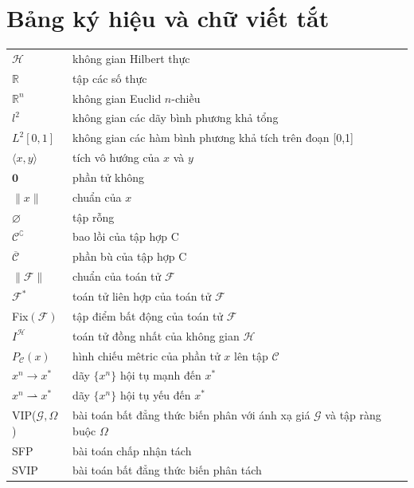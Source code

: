 \chapter*{Bảng ký hiệu và chữ viết tắt}

\begin{tabular}
    {@{\hspace{0.6cm}} l @{\hspace{1.8cm}}p{11.5cm}l}
    $\mathcal{H}$ & không gian Hilbert thực\\
    $\mathbb R$ & tập các số thực\\
    $\mathbb R^n$ & không gian Euclid $n$-chiều\\
    $l^2$ & không gian các dãy bình phương khả tổng\\
    $L^2[0,1]$ & không gian các hàm bình phương khả tích trên đoạn [0,1]\\
    $\langle x,y\rangle$ & tích vô hướng của $x$ và $y$\\
    $\mathbf{0}$ & phần tử không\\
    $\|x\|$ & chuẩn của $x$\\
    $\varnothing$ & tập rỗng\\
    $\mathcal{C}^\complement$ & bao lồi của tập hợp C\\
    $\overline{\mathcal{C}}$ & phần bù của tập hợp C\\
    $\|\mathcal{F}\|$ & chuẩn của toán tử $\mathcal{F}$\\
    $\mathcal{F}^*$ & toán tử liên hợp của toán tử $\mathcal{F}$\\
    Fix$(\mathcal{F})$ & tập điểm bất động của toán tử $\mathcal{F}$\\
    $I^{\mathcal{H}}$ & toán tử đồng nhất của không gian $\mathcal{H}$\\
    $P_\mathcal{C}(x)$ & hình chiếu mêtric của phần tử $x$ lên tập $\mathcal{C}$\\
    $x^n \to x^*$ & dãy $\{x^n\}$ hội tụ mạnh đến $x^*$\\
    $x^n \rightharpoonup x^*$ & dãy $\{x^n\}$ hội tụ yếu đến $x^*$\\
    VIP($\mathcal{G}, \Omega$) & bài toán bất đẳng thức biến phân với ánh xạ giá $\mathcal{G}$ và tập ràng buộc $\Omega$\\
    SFP & bài toán chấp nhận tách\\
    SVIP & bài toán bất đẳng thức biến phân tách
\end{tabular}
